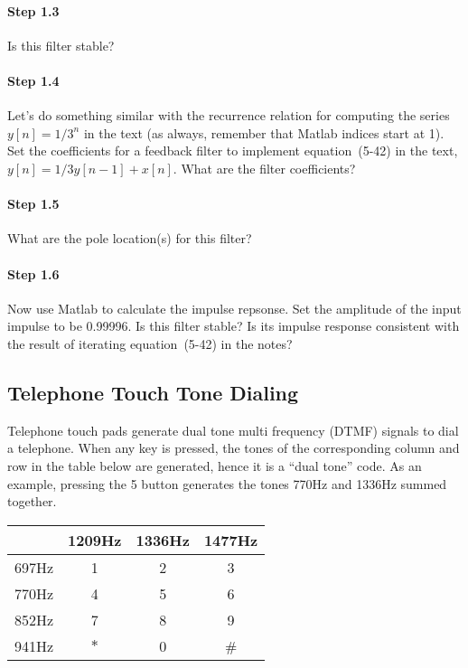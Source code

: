 \paragraph{Step 1.3} Is this filter stable?


\paragraph{Step 1.4} Let's do something similar with the recurrence
relation for computing the series $y[n] = 1/3^n$ in the text (as
always, remember that Matlab indices start at 1). Set the
coefficients for a feedback filter to implement equation~(5-42) in the
text, $y[n] = 1/3 y[n-1] + x[n]$. What are the filter coefficients?


\paragraph{Step 1.5} What are the pole location(s) for this filter?


\paragraph{Step 1.6} Now use Matlab to calculate the impulse repsonse.
Set the amplitude of the input impulse to be 0.99996. Is this filter
stable?  Is its impulse response consistent with the result of
iterating equation~(5-42) in the notes?


\subsection{Telephone Touch Tone Dialing}
Telephone touch pads generate dual tone multi frequency (DTMF) signals
to dial a telephone. When any key is pressed, the tones of the
corresponding column and row in the table below are generated, hence
it is a ``dual tone'' code. As an example, pressing the 5 button
generates the tones 770Hz and 1336Hz summed together.

\begin{center}
  \begin{tabular}{l|ccc}
    & 1209Hz & 1336Hz & 1477Hz \\ \hline
    697Hz &   1    &   2    &   3    \\
    770Hz &   4    &   5    &   6    \\
    852Hz &   7    &   8    &   9    \\
    941Hz &   $\ast $    &   0    &   \#    
  \end{tabular}
\end{center}

